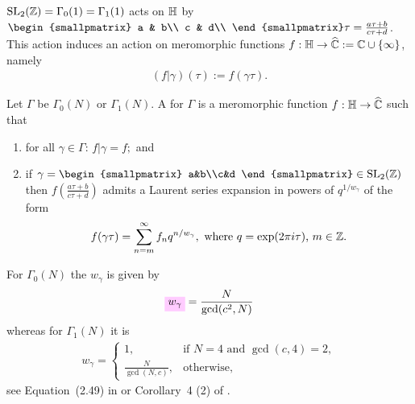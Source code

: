 \documentclass{article}
\begin{document}
$\SL2Z = \Gamma_0(1) = \Gamma_1(1)$ acts on $\mathbb{H}$ by
$
\begin{smallpmatrix}
  a & b\\
  c & d\\
\end{smallpmatrix} \tau
=
\frac{a \tau + b}{c \tau + d}
$.
%
This action induces an action on meromorphic functions
$f:\mathbb{H}\to\widehat{\mathbb{C}}:=\mathbb{C}\cup\left\{\infty\right\}$, namely
\begin{gather*}
  (f|\gamma)(\tau) := f(\gamma \tau).
\end{gather*}
%

Let $\Gamma$ be $\Gamma_0(N)$ or $\Gamma_1(N)$.
A  for $\Gamma$ is a meromorphic
function $f:\mathbb{H}\to\widehat{\mathbb{C}}$ such that
\begin{enumerate}
\item for all $\gamma \in \Gamma$:
  \begin{math}
    f|\gamma = f;
  \end{math} and
\item if
  $\gamma =
  \begin{smallpmatrix}
    a&b\\c&d
  \end{smallpmatrix}
  \in \mathrm{SL}_2(\setZ)$ then $f\left(\frac{a \tau + b}{c \tau + d}\right)$
  admits a Laurent series expansion in powers of $q^{1/w_\gamma}$ of the form
  \begin{gather}
    \label{eq:f(gamma*tau)-expansion}
    f(\gamma\tau) = \sum_{n=m}^\infty f_n q^{n/w_\gamma},
    \text{ where $q=\exp(2\pi i\tau)$, $m \in \mathbb{Z}$.}
  \end{gather}
\end{enumerate}

For $\Gamma_0(N)$ the  $w_\gamma$ is given by
\begin{gather}
  \defineNotation[w-gamma]{w_\gamma} = \frac{N}{\gcd(c^2, N)}
  \label{eq:width0}
\end{gather}
whereas for $\Gamma_1(N)$ it is
\begin{gather}
  w_\gamma
  =
  \begin{cases}
    1,                   & \text{if $N=4$ and $\gcd(c,4)=2$},\\
    \frac{N}{\gcd(N,c)}, & \text{otherwise},
  \end{cases}
  \label{eq:width1}
\end{gather}
see Equation~(2.49) in
\cite{ChenDuZhao_FindingModularFunctionsRamanujan_2019} or Corollary~4
(2) of \cite{ChoKooPark_ArithmeticRamanujanGoellnitzGordon_2009}.
\end{document}
